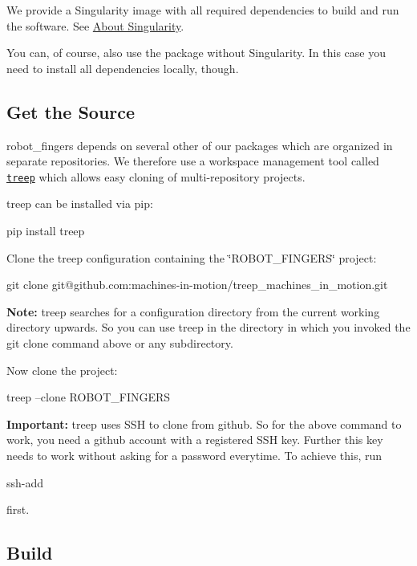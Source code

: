 We provide a Singularity image with all required dependencies to build and run the software. See \hyperlink{md_doc_singularity}{About Singularity}.

You can, of course, also use the package without Singularity. In this case you need to install all dependencies locally, though.

\subsection*{Get the Source }

{\ttfamily robot\+\_\+fingers} depends on several other of our packages which are organized in separate repositories. We therefore use a workspace management tool called \href{https://pypi.org/project/treep/}{\tt treep} which allows easy cloning of multi-\/repository projects.

treep can be installed via pip\+: \begin{DoxyVerb}pip install treep
\end{DoxyVerb}


Clone the treep configuration containing the \char`\"{}\+R\+O\+B\+O\+T\+\_\+\+F\+I\+N\+G\+E\+R\+S\char`\"{} project\+: \begin{DoxyVerb}git clone git@github.com:machines-in-motion/treep_machines_in_motion.git
\end{DoxyVerb}


{\bfseries Note\+:} treep searches for a configuration directory from the current working directory upwards. So you can use treep in the directory in which you invoked the {\ttfamily git clone} command above or any subdirectory.

Now clone the project\+: \begin{DoxyVerb}treep --clone ROBOT_FINGERS
\end{DoxyVerb}


{\bfseries Important\+:} treep uses S\+SH to clone from github. So for the above command to work, you need a github account with a registered S\+SH key. Further this key needs to work without asking for a password everytime. To achieve this, run \begin{DoxyVerb}ssh-add
\end{DoxyVerb}


first.

\subsection*{Build }

